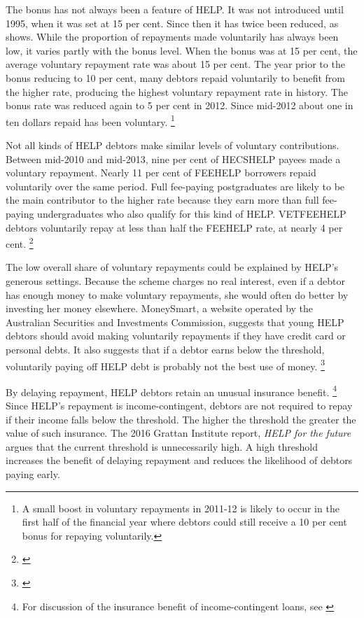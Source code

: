 \documentclass[embargoed]{grattan}
\begin{document}
The bonus has not always been a feature of \gls{HELP}.
It was not introduced until 1995, when it was set at 15 per cent.
Since then it has twice been reduced, as  shows.
While the proportion of repayments made voluntarily has always been low, it varies partly with the bonus level.
When the bonus was at 15 per cent, the average voluntary repayment rate was about 15 per cent.
The year prior to the bonus reducing to 10 per cent, many debtors repaid voluntarily to benefit from the higher rate, producing the highest voluntary repayment rate in history.
The bonus rate was reduced again to 5 per cent in 2012.
Since mid-2012 about one in ten dollars repaid has been voluntary.%
\footnote{A small boost in voluntary repayments in 2011-12 is likely to occur in the first half of the financial year where debtors could still receive a 10 per cent bonus for repaying voluntarily.}

Not all kinds of \gls{HELP} debtors make similar levels of voluntary contributions.
Between mid-2010 and mid-2013, nine per cent of \gls{HECSHELP} payees made a voluntary repayment.
Nearly 11 per cent of \gls{FEEHELP} borrowers repaid voluntarily over the same period.
Full fee-paying postgraduates are likely to be the main contributor to the higher rate because they earn more than full fee-paying undergraduates who also qualify for this kind of \gls{HELP}.
\gls{VETFEEHELP} debtors voluntarily repay at less than half the \gls{FEEHELP} rate, at nearly 4 per cent.%
\footnote{\textcite[][p. 33]{ANAO2016AdministrationHigherEducation}}

The low overall share of voluntary repayments could be explained by \gls{HELP}'s generous settings.
Because the scheme charges no real interest, even if a debtor has enough money to make voluntary repayments, she would often do better by investing her money elsewhere.
MoneySmart, a website operated by the Australian Securities and Investments Commission, suggests that young \gls{HELP} debtors should avoid making voluntarily repayments if they have credit card or personal debts.
It also suggests that if a debtor earns below the threshold, voluntarily paying off \gls{HELP} debt is probably not the best use of money.%
\footnote{\textcite{MoneySmart2016Payingyouruni}}

By delaying repayment, \gls{HELP} debtors retain an unusual insurance benefit.%
\footnote{For discussion of the insurance benefit of income-contingent loans, see \textcite[][p. 36]{Chapman2014Incomecontingentloans}} Since \gls{HELP}'s repayment is income-contingent, debtors are not required to repay if their income falls below the threshold.
The higher the threshold the greater the value of such insurance.
The 2016 Grattan Institute report, \emph{HELP for the future} argues that the current threshold is unnecessarily high.
A high threshold increases the benefit of delaying repayment and reduces the likelihood of debtors paying early.
\end{document}
